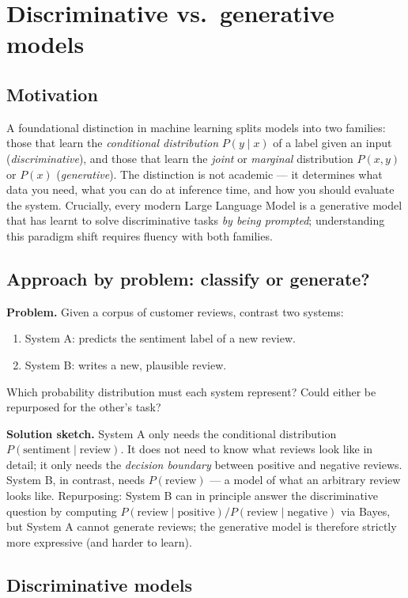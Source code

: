 \section{Discriminative vs.\ generative models}

\subsection{Motivation}
A foundational distinction in machine learning splits models into two families: those that learn the \emph{conditional distribution} $P(y \mid x)$ of a label given an input (\emph{discriminative}), and those that learn the \emph{joint} or \emph{marginal} distribution $P(x, y)$ or $P(x)$ (\emph{generative}). The distinction is not academic --- it determines what data you need, what you can do at inference time, and how you should evaluate the system. Crucially, every modern Large Language Model is a generative model that has learnt to solve discriminative tasks \emph{by being prompted}; understanding this paradigm shift requires fluency with both families.

\subsection{Approach by problem: classify or generate?}
\textbf{Problem.} Given a corpus of customer reviews, contrast two systems:
\begin{enumerate}
    \item System A: predicts the sentiment label of a new review.
    \item System B: writes a new, plausible review.
\end{enumerate}
Which probability distribution must each system represent? Could either be repurposed for the other's task?

\textbf{Solution sketch.} System A only needs the conditional distribution $P(\text{sentiment} \mid \text{review})$. It does not need to know what reviews look like in detail; it only needs the \emph{decision boundary} between positive and negative reviews. System B, in contrast, needs $P(\text{review})$ --- a model of what an arbitrary review looks like. Repurposing: System B can in principle answer the discriminative question by computing $P(\text{review} \mid \text{positive}) / P(\text{review} \mid \text{negative})$ via Bayes, but System A cannot generate reviews; the generative model is therefore strictly more expressive (and harder to learn).

\subsection{Discriminative models}


